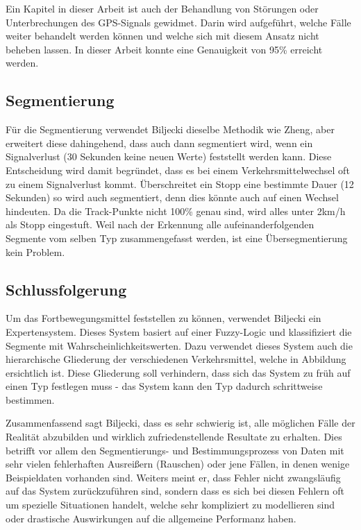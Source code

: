 Ein Kapitel in dieser Arbeit ist auch der Behandlung von Störungen oder Unterbrechungen des GPS-Signals gewidmet. Darin wird aufgeführt, welche Fälle weiter behandelt werden können und welche sich mit diesem Ansatz nicht beheben lassen. In dieser Arbeit konnte eine Genauigkeit von 95\% erreicht werden.

\subsection{Segmentierung}
Für die Segmentierung verwendet Biljecki dieselbe Methodik wie Zheng, aber erweitert diese dahingehend, dass auch dann segmentiert wird, wenn ein Signalverlust (30 Sekunden keine neuen Werte) feststellt werden kann. Diese Entscheidung wird damit begründet, dass es bei einem Verkehrsmittelwechsel oft zu einem Signalverlust kommt. 
Überschreitet ein Stopp eine bestimmte Dauer (12 Sekunden) so wird auch segmentiert, denn dies könnte auch auf einen Wechsel hindeuten. Da die Track-Punkte nicht 100\% genau sind, wird alles unter 2km/h als Stopp eingestuft. Weil nach der Erkennung alle aufeinanderfolgenden Segmente vom selben Typ zusammengefasst werden, ist eine Übersegmentierung kein Problem.

\subsection{Schlussfolgerung}
Um das Fortbewegungsmittel feststellen zu können, verwendet Biljecki ein Expertensystem. Dieses System basiert auf einer Fuzzy-Logic und klassifiziert die Segmente mit Wahrscheinlichkeitswerten. Dazu verwendet dieses System auch die hierarchische Gliederung der verschiedenen Verkehrsmittel, welche in Abbildung  ersichtlich ist. Diese Gliederung soll verhindern, dass sich das System zu früh auf einen Typ festlegen muss - das System kann den Typ dadurch schrittweise bestimmen.


Zusammenfassend sagt Biljecki, dass es sehr schwierig ist, alle möglichen Fälle der Realität abzubilden und wirklich zufriedenstellende Resultate zu erhalten. Dies betrifft vor allem den Segmentierungs- und Bestimmungsprozess von Daten mit sehr vielen fehlerhaften Ausreißern (Rauschen) oder jene Fällen, in denen wenige Beispieldaten vorhanden sind. Weiters meint er, dass Fehler nicht zwangsläufig auf das System zurückzuführen sind, sondern dass es sich bei diesen Fehlern oft um spezielle Situationen handelt, welche sehr kompliziert zu modellieren sind oder drastische Auswirkungen auf die allgemeine Performanz haben.

